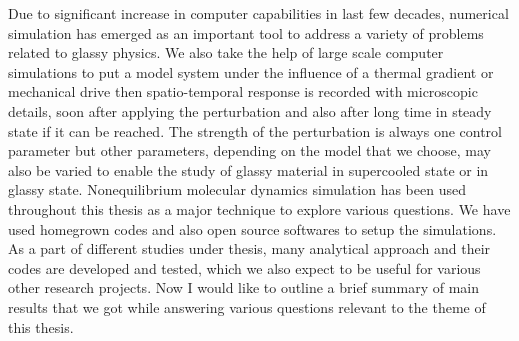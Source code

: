 Due to significant increase in computer capabilities in last few decades, numerical simulation has emerged as an important tool to address a variety of problems related to glassy physics. We also take the help of large scale computer simulations to put a model system  under the influence of a thermal gradient or mechanical drive then spatio-temporal response is recorded with microscopic details, soon after applying the perturbation and also after long time in steady state if it can be reached. The strength of the perturbation is always one control parameter but other parameters, depending on the model that we choose, may also be varied to enable the study of glassy material in supercooled state or in glassy state. Nonequilibrium molecular dynamics simulation has been used throughout this thesis as a major technique  to explore various questions.  We have used homegrown codes and also open source softwares \cite{plimpton1995fast, stukowski2009visualization} to setup the simulations. As a part of different studies under thesis, many analytical approach and their codes are developed and  tested, which we also expect to be useful for various other research projects. Now I would like to outline a brief summary of main results that we got while answering various questions relevant to the theme of this thesis.

